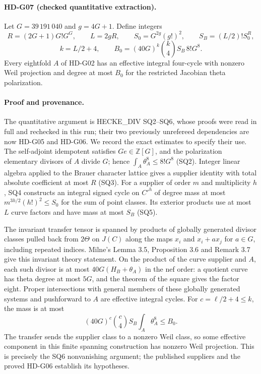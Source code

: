 \paragraph{HD-G07 (checked quantitative extraction).}
Let $G=39\,191\,040$ and $g=4G+1$. Define integers
\[
R=(2G+1)G!G^G,\qquad L=2gR,\qquad
S_0=G^{2g}(g!)^2,\qquad S_B=(L/2)!S_0^R,
\]
\[
k=L/2+4,\qquad
B_0=(40G)^k\binom{k}{4}S_B\,8!G^8.
\]
Every eightfold $A$ of HD-G02 has an effective integral four-cycle
with nonzero Weil projection and degree at most $B_0$ for the restricted
Jacobian theta polarization.

\paragraph{Proof and provenance.}
The quantitative argument is HECKE\_DIV SQ2--SQ6, whose proofs were
read in full and rechecked in this run; their two previously unrefereed
dependencies are now HD-G05 and HD-G06. We record the exact estimates
to specify their use. The self-adjoint idempotent satisfies $Ge\in\mathbb Z[G]$,
and the polarization elementary divisors of $A$ divide $G$; hence
$\int_A\theta_A^8\le8!G^8$ (SQ2). Integer linear algebra applied to
the Brauer character lattice gives a supplier identity with total
absolute coefficient at most $R$ (SQ3). For a supplier of order $m$
and multiplicity $h$, SQ4 constructs an integral signed cycle on $C'^h$
of degree mass at most $m^{3h/2}(h!)^2\le S_0$ for the sum of point classes.
Its exterior products use at most $L$ curve factors and have mass
at most $S_B$ (SQ5).

The invariant transfer tensor is spanned by products of globally
generated divisor classes pulled back from $2\Theta$ on $J(C)$ along
the maps $x_i$ and $x_i+ax_j$ for $a\in G$, including repeated indices.
Milne's Lemma 3.5, Proposition 3.6 and Remark 3.7 give this invariant
theory statement. On the product of the curve supplier and $A$, each
such divisor is at most $40G(H_B+\theta_A)$ in the nef order: a quotient
curve has theta degree at most $5G$, and the theorem of the square
gives the factor eight. Proper intersections with general members
of these globally generated systems and pushforward to $A$ are
effective integral cycles. For $c=\ell/2+4\le k$, the mass is at most
\[
(40G)^c\binom c4 S_B\int_A\theta_A^8\le B_0.
\]
The transfer sends the supplier class to a nonzero Weil class, so some
effective component in this finite spanning construction has nonzero
Weil projection. This is precisely the SQ6 nonvanishing argument;
the published suppliers and the proved HD-G06 establish its hypotheses.

